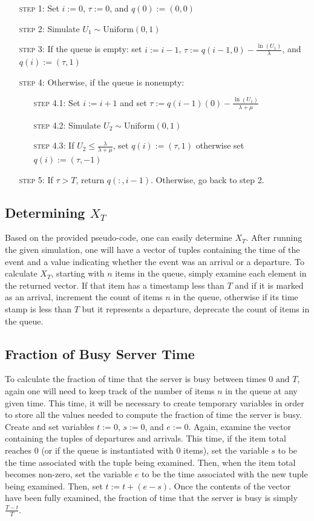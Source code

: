 \documentclass[11pt, oneside]{article}
\begin{document}
\begin{enumerate}[leftmargin=30pt,labelindent=65pt,itemindent=30pt]
\item[\textsc{step 1:}] Set $i:=0$, $\tau:=0$, and $q(0):=(0,0)$
\item[\textsc{step 2:}] Simulate $U_1 \sim \text{Uniform}(0,1)$
\item[\textsc{step 3:}] If the queue is empty: set $i:=i-1$, $\tau:=q(i-1,0) - \frac{\ln(U_1)}{\lambda}$, and $q(i):=(\tau, 1)$
\item[\textsc{step 4:}] Otherwise, if the queue is nonempty:
\begin{enumerate}[leftmargin=25pt,labelindent=65pt,itemindent=25pt]
\item[\textsc{step 4.1:}] Set $i:=i+1$ and set $\tau:=q(i-1)(0) - \frac{\ln(U_1)}{\lambda + \mu}$
\item[\textsc{step 4.2:}] Simulate $U_2\sim\text{Uniform}(0,1)$
\item[\textsc{step 4.3:}] If $U_2 \leq \frac{\lambda}{\lambda+\mu}$, set $q(i):=(\tau, 1)$ otherwise set $q(i):=(\tau,-1)$
\end{enumerate}
\item[\textsc{step 5:}] If $\tau > T$, return $q(:,i-1)$. Otherwise, go back to step 2.
\end{enumerate}

\subsection{Determining $X_T$}
Based on the provided pseudo-code, one can easily determine $X_T$. After running the given simulation, one will have a vector of tuples containing the time of the event and a value indicating whether the event was an arrival or a departure. To calculate $X_T$, starting with $n$ items in the queue, simply examine each element in the returned vector. If that item has a timestamp less than $T$ and if it is marked as an arrival, increment the count of items $n$ in the queue, otherwise if its time stamp is less than $T$ but it represents a departure, deprecate the count of items in the queue.

\subsection{Fraction of Busy Server Time}
To calculate the fraction of time that the server is busy between times $0 \text{ and } T$, again one will need to keep track of the number of items $n$ in the queue at any given time. This time, it will be necessary to create temporary variables in order to store all the values needed to compute the fraction of time the server is busy. Create and set variables $t:=0$, $s:=0$, and $e:=0$. Again, examine the vector containing the tuples of departures and arrivals. This time, if the item total reaches $0$ (or if the queue is instantiated with $0$ items), set the variable $s$ to be the time associated with the tuple being examined. Then, when the item total becomes non-zero, set the variable $e$ to be the time associated with the new tuple being examined. Then, set $t:=t+(e-s)$. Once the contents of the vector have been fully examined, the fraction of time that the server is busy is simply $\frac{T-t}{T}$.
\end{document}
